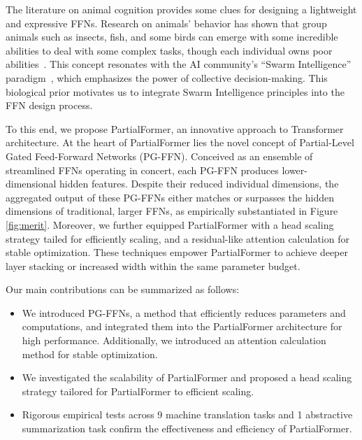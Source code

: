 \documentclass[11pt]{article}
\begin{document}
The literature on animal cognition provides some clues for designing a lightweight and expressive FFNs. 
Research on animals' behavior has shown that group animals such as insects, fish, and some birds can emerge with some incredible abilities to deal with some complex tasks, though each individual owns poor abilities~\cite{couzin2009collective, conradt2005consensus}. 
This concept resonates with the AI community's ``Swarm Intelligence'' paradigm~\cite{Bonabeau1999SwarmIntelligence}, which emphasizes the power of collective decision-making. This biological prior motivates us to integrate Swarm Intelligence principles into the FFN design process.




To this end, we propose PartialFormer, an innovative approach to Transformer architecture. 
At the heart of PartialFormer lies the novel concept of Partial-Level Gated Feed-Forward Networks (PG-FFN). Conceived as an ensemble of streamlined FFNs operating in concert, each PG-FFN produces lower-dimensional hidden features. Despite their reduced individual dimensions, the aggregated output of these PG-FFNs either matches or surpasses the hidden dimensions of traditional, larger FFNs, as empirically substantiated in Figure \ref{fig:merit}. Moreover, we further equipped PartialFormer with a head scaling strategy tailed for efficiently scaling, and a residual-like attention calculation for stable optimization. These techniques empower PartialFormer to achieve deeper layer stacking or increased width within the same parameter budget.


Our main contributions can be summarized as follows:
\begin{itemize}[itemsep=0pt,topsep=0pt,parsep=0pt]
\item We introduced PG-FFNs, a method that efficiently reduces parameters and computations, and integrated them into the PartialFormer architecture for high performance. Additionally, we introduced an attention calculation method for stable optimization.
    \item We investigated the scalability of PartialFormer and proposed a head scaling strategy tailored for PartialFormer to efficient scaling.
    \item Rigorous empirical tests across 9 machine translation tasks and 1 abstractive summarization task confirm the effectiveness and efficiency of PartialFormer.
\end{itemize}
\end{document}
